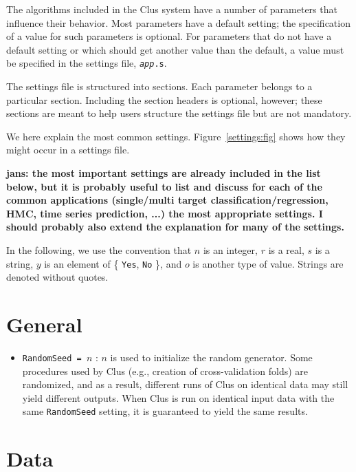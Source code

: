 \documentclass[a4paper]{report}
\begin{document}
The algorithms included in the Clus system have a number of parameters that influence their behavior.  Most parameters have a default setting; the specification of a value for such parameters is optional.  For parameters that do not have a default setting or which should get another value than the default, a value must be specified in the settings file, {\tt {\em app}.s}.

The settings file is structured into sections.  Each parameter belongs to a particular section.  Including the section headers is optional, however; these sections are meant to help users structure the settings file but are not mandatory.

We here explain the most common settings.  Figure~\ref{settings:fig} shows how they might occur in a settings file.

{\bf * jans: the most important settings are already included in the list below, but it is probably useful to list and discuss for each of the common applications (single/multi target classification/regression, HMC, time series prediction, ...) the most appropriate settings. I should probably also extend the explanation for many of the settings.}

In the following, we use the convention that $n$ is an integer, $r$ is a real, $s$ is a string, $y$ is an element of \{ {\tt Yes}, {\tt No} \}, and $o$ is another type of value.  Strings are denoted without quotes.

\section{General}

\begin{itemize}
\item {\tt RandomSeed = $n$} : $n$ is used to initialize the random generator.
Some procedures used by Clus (e.g., creation of cross-validation folds) are randomized, and as a result, different runs of Clus on identical data may still yield different outputs.  When Clus is run on identical input data with the same {\tt RandomSeed} setting, it is guaranteed to yield the same results.
\end{itemize}

\section{Data}
\end{document}
